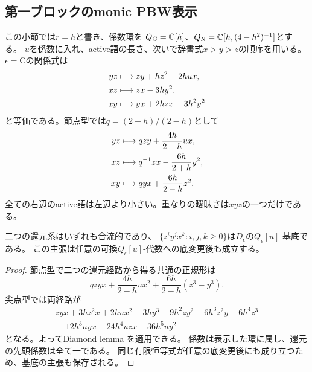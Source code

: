 \subsection{第一ブロックのmonic PBW表示}
この小節では$r=h$と書き、係数環を
$Q_{\mathrm C}=\mathbb C[h]$、$Q_{\mathrm N}=\mathbb C[h,(4-h^2)^{-1}]$とする。
$u$を係数に入れ、active語の長さ、次いで辞書式$x>y>z$の順序を用いる。
$\epsilon=\mathrm C$の関係式は
\begin{align}
 yz&\longmapsto zy+hz^2+2hux,\notag\\
 xz&\longmapsto zx-3hy^2,\notag\\
 xy&\longmapsto yx+2hzx-3h^2y^2
 \label{nq:eq:cusp-rewrite}
\end{align}
と等価である。節点型では$q=(2+h)/(2-h)$として
\begin{align}
 yz&\longmapsto qzy+\frac{4h}{2-h}ux,\notag\\
 xz&\longmapsto q^{-1}zx-\frac{6h}{2+h}y^2,\notag\\
 xy&\longmapsto qyx+\frac{6h}{2-h}z^2.
 \label{nq:eq:node-rewrite}
\end{align}
全ての右辺のactive語は左辺より小さい。重なりの曖昧さは$xyz$の一つだけである。
\begin{lemma}[全次数と任意の底変更に対するPBW性]
\label{nq:lem:pbw}
二つの還元系はいずれも合流的であり、
$\{z^iy^jx^k:i,j,k\ge0\}$は$D_\epsilon$の$Q_\epsilon[u]$-基底である。
この主張は任意の可換$Q_\epsilon[u]$-代数への底変更後も成立する。
\end{lemma}
\begin{proof}
節点型で二つの還元経路から得る共通の正規形は
\begin{equation}
 qzyx+\frac{4h}{2-h}ux^2+\frac{6h}{2-h}(z^3-y^3).
\end{equation}
尖点型では両経路が
\begin{equation}\begin{aligned}
 zyx+3hz^2x+2hux^2-3hy^3-9h^2zy^2-6h^3z^2y
 -6h^4z^3\\
 {}-12h^3uyx-24h^4uzx+36h^5uy^2
\end{aligned}\end{equation}
となる。よってDiamond lemma \cite[Theorem 1.2]{BergNE12}を適用できる。
係数は表示した環に属し、還元の先頭係数は全て一である。
同じ有限恒等式が任意の底変更後にも成り立つため、基底の主張も保存される。
\end{proof}

